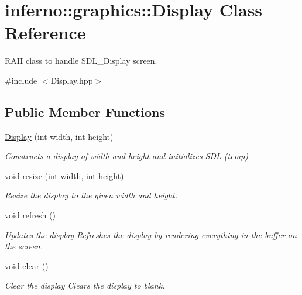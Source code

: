 \hypertarget{classinferno_1_1graphics_1_1_display}{}\section{inferno\+:\+:graphics\+:\+:Display Class Reference}
\label{classinferno_1_1graphics_1_1_display}


R\+A\+II class to handle S\+D\+L\+\_\+\+Display screen.  




{\ttfamily \#include $<$Display.\+hpp$>$}

\subsection*{Public Member Functions}
\begin{DoxyCompactItemize}
\item 
\mbox{\hyperlink{classinferno_1_1graphics_1_1_display_a8209b018b72b97990c10e67054ef813e}{Display}} (int width, int height)
\begin{DoxyCompactList}\small\item\em Constructs a display of width and height and initializes S\+DL (temp) \end{DoxyCompactList}\item 
void \mbox{\hyperlink{classinferno_1_1graphics_1_1_display_a8344f8d17d3706be8151e2c3104a8f4f}{resize}} (int width, int height)
\begin{DoxyCompactList}\small\item\em Resize the display to the given width and height. \end{DoxyCompactList}\item 
void \mbox{\hyperlink{classinferno_1_1graphics_1_1_display_aa9e6f091dcb104339b0cee371ca84d2b}{refresh}} ()
\begin{DoxyCompactList}\small\item\em Updates the display Refreshes the display by rendering everything in the buffer on the screen. \end{DoxyCompactList}\item 
void \mbox{\hyperlink{classinferno_1_1graphics_1_1_display_a9197ea5fd4c5b65ebc60f5f4c034794f}{clear}} ()
\begin{DoxyCompactList}\small\item\em Clear the display Clears the display to blank. \end{DoxyCompactList}\item 

\end{DoxyCompactItemize}
